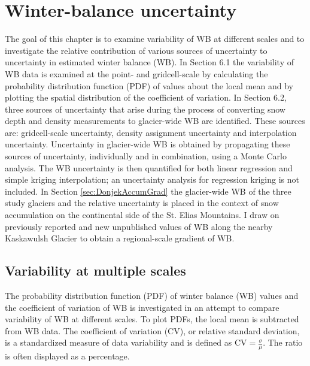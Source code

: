 \documentclass{sfuthesis}
\begin{document}

\chapter{Winter-balance uncertainty}
\label{sec:UncertaintyAnalysis}

The goal of this chapter is to examine variability of WB at different scales and to investigate the relative contribution of various sources of uncertainty to uncertainty in estimated winter balance (WB). In Section 6.1 the variability of WB data is examined at the point- and gridcell-scale by calculating the probability distribution function (PDF) of values about the local mean and by plotting the spatial distribution of the coefficient of variation. In Section 6.2, three sources of uncertainty that arise during the process of converting snow depth and density measurements to glacier-wide WB are identified. These sources are: gridcell-scale uncertainty, density assignment uncertainty and interpolation uncertainty. Uncertainty in glacier-wide WB is obtained by propagating these sources of uncertainty, individually and in combination, using a Monte Carlo analysis. The WB uncertainty is then quantified for both linear regression and simple kriging interpolation; an uncertainty analysis for regression kriging is not included. In Section \ref{sec:DonjekAccumGrad} the glacier-wide WB of the three study glaciers and the relative uncertainty is placed in the context of snow accumulation on the continental side of the St. Elias Mountains. I draw on previously reported and new unpublished values of WB along the nearby Kaskawulsh Glacier to obtain a regional-scale gradient of WB.

\section{Variability at multiple scales}

The probability distribution function (PDF) of winter balance (WB) values and the coefficient of variation of WB is investigated in an attempt to compare variability of WB at different scales. To plot PDFs, the local mean is subtracted from WB data. The coefficient of variation (CV), or relative standard deviation, is a standardized measure of data variability and is defined as $\mathrm{CV} = \frac{\sigma}{\mu}$. The ratio is often displayed as a percentage.
\end{document}
